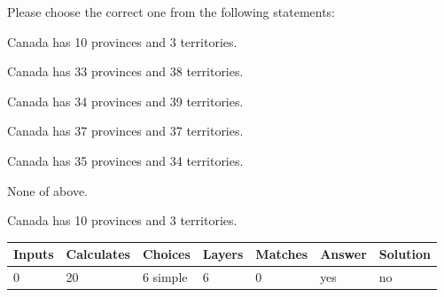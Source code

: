 \documentclass[12pt]{article}
\begin{document}
  
Please choose the correct one from the following statements:
 
 
Canada has  %
10 provinces and  %
3 territories.
 
 
Canada has  %
33 provinces and  %
38 territories.
 
 
Canada has  %
34 provinces and  %
39 territories.
 
 
Canada has  %
37 provinces and  %
37 territories.
 
 
Canada has  %
35 provinces and  %
34 territories.
 
 
 None of above.
 
 
\noindent{}
 
 
Canada has  %
10 provinces and  %
3 territories.
 
 
\noindent{}
 
 
   
   
   
   
\noindent\begin{tabular}{|l|l|l|l|l|l|l|}
 \hline
Inputs & Calculates & Choices & Layers & Matches & Answer & Solution \\ \hline
           0  & 
          20  & 
           6
  simple  
  & 
           6  & 
           0  & 
  yes & 
  no 
  \\ \hline
 \end{tabular}
   
   
   
   
\noindent{}
   
   
  
\end{document}
